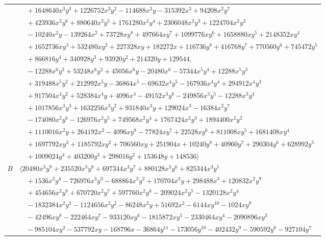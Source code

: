 \documentclass[11pt]{article}
\begin{document}
\begin{longtable}{@{}ll@{}}
 & $\quad +1648640x^{3}y^{3}+1226752x^{3}y^{2}-114688x^{3}y-315392x^{3}+94208x^{2}y^{7}$\\
 & $\quad +423936x^{2}y^{6}+880640x^{2}y^{5}+1761280x^{2}y^{4}+2306048x^{2}y^{3}+1224704x^{2}y^{2}$\\
 & $\quad -10240x^{2}y-139264x^{2}+73728xy^{8}+497664xy^{7}+1099776xy^{6}+1658880xy^{5}+2148352xy^{4}$\\
 & $\quad +1652736xy^{3}+532480xy^{2}+227328xy+182272x+116736y^{8}+416768y^{7}+770560y^{6}+745472y^{5}$\\
 & $\quad +866816y^{4}+340928y^{3}+93920y^{2}+214320y+129544,$\\
 & $\quad -12288x^{6}y^{3}+53248x^{6}y^{2}+45056x^{6}y-20480x^{6}-57344x^{5}y^{4}+12288x^{5}y^{3}$\\
 & $\quad +319488x^{5}y^{2}+212992x^{5}y-36864x^{5}-69632x^{4}y^{5}-167936x^{4}y^{4}+294912x^{4}y^{3}$\\
 & $\quad +917504x^{4}y^{2}+528384x^{4}y+4096x^{4}-49152x^{3}y^{6}-249856x^{3}y^{5}-12288x^{3}y^{4}$\\
 & $\quad +1017856x^{3}y^{3}+1632256x^{3}y^{2}+931840x^{3}y+129024x^{3}-16384x^{2}y^{7}$\\
 & $\quad -174080x^{2}y^{6}-126976x^{2}y^{5}+749568x^{2}y^{4}+1767424x^{2}y^{3}+1894400x^{2}y^{2}$\\
 & $\quad +1110016x^{2}y+264192x^{2}-4096xy^{8}-77824xy^{7}+22528xy^{6}+811008xy^{5}+1681408xy^{4}$\\
 & $\quad +1697792xy^{3}+1185792xy^{2}+706560xy+251904x+10240y^{8}+40960y^{7}+290304y^{6}+628992y^{5}$\\
 & $\quad +1009024y^{4}+403200y^{3}+298016y^{2}+153648y+148536\rangle$\\
$B$ & $\langle 20480x^{3}y^{9}+235520x^{3}y^{8}+697344x^{3}y^{7}+880128x^{3}y^{6}+825344x^{3}y^{5}$\\
 & $\quad +1536x^{3}y^{4}-726976x^{3}y^{3}-688864x^{3}y^{2}+170704x^{3}y+298488x^{3}+120832x^{2}y^{9}$\\
 & $\quad +454656x^{2}y^{8}+670720x^{2}y^{7}+597760x^{2}y^{6}-209024x^{2}y^{5}-1320128x^{2}y^{4}$\\
 & $\quad -1832384x^{2}y^{3}-1124656x^{2}y^{2}-86248x^{2}y+51692x^{2}-6144xy^{10}-1024xy^{9}$\\
 & $\quad -42496xy^{8}-222464xy^{7}-933120xy^{6}-1815872xy^{5}-2330464xy^{4}-2090896xy^{3}$\\
 & $\quad -985104xy^{2}-537792xy-168796x-36864y^{11}-173056y^{10}-402432y^{9}-590592y^{8}-927104y^{7}$\\

\end{longtable}
\end{document}
